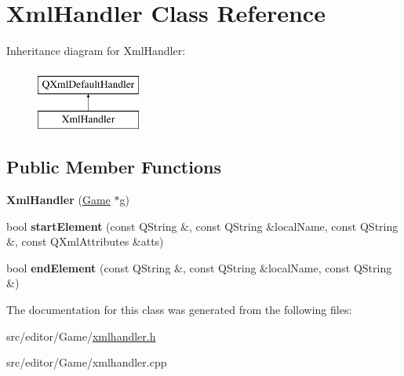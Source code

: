 \hypertarget{class_xml_handler}{}\section{Xml\+Handler Class Reference}
\label{class_xml_handler}
Inheritance diagram for Xml\+Handler\+:\begin{figure}[H]
\begin{center}
\leavevmode
\includegraphics[height=2.000000cm]{class_xml_handler}
\end{center}
\end{figure}
\subsection*{Public Member Functions}
\begin{DoxyCompactItemize}
\item 
\hypertarget{class_xml_handler_a98cf939ef528aa336c7e4b2ae7f1a431}{}\label{class_xml_handler_a98cf939ef528aa336c7e4b2ae7f1a431} 
{\bfseries Xml\+Handler} (\hyperlink{class_game}{Game} $\ast$g)
\item 
\hypertarget{class_xml_handler_a23b06b0d562fa3be82b42f46148a4175}{}\label{class_xml_handler_a23b06b0d562fa3be82b42f46148a4175} 
bool {\bfseries start\+Element} (const Q\+String \&, const Q\+String \&local\+Name, const Q\+String \&, const Q\+Xml\+Attributes \&atts)
\item 
\hypertarget{class_xml_handler_a647d0b062e0d8c8d4b65bfe040dee441}{}\label{class_xml_handler_a647d0b062e0d8c8d4b65bfe040dee441} 
bool {\bfseries end\+Element} (const Q\+String \&, const Q\+String \&local\+Name, const Q\+String \&)
\end{DoxyCompactItemize}


The documentation for this class was generated from the following files\+:\begin{DoxyCompactItemize}
\item 
src/editor/\+Game/\hyperlink{xmlhandler_8h}{xmlhandler.\+h}\item 
src/editor/\+Game/xmlhandler.\+cpp\end{DoxyCompactItemize}
